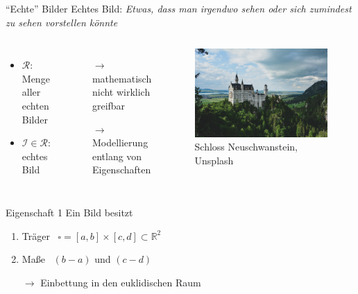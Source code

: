 \documentclass[10pt]{beamer}
\newcommand{\R}{\mathbb{R}}
\begin{document}
\begin{frame}{``Echte'' Bilder}
  \alert{Echtes Bild}: \emph{Etwas, dass man irgendwo sehen oder sich zumindest zu sehen vorstellen könnte}

  \begin{columns}[T,onlytextwidth]
      \begin{itemize}
        \item \( \mathcal{R} \): Menge aller echten Bilder
        \item \( \mathcal{I} \in \mathcal{R} \): echtes Bild
      \end{itemize}

      \begin{itemize}
        \pause{}
        \item[\( \to \)] mathematisch nicht wirklich greifbar \\
        \pause{}
        \item[\( \to \)] Modellierung entlang von Eigenschaften
      \end{itemize}
      \pause{}
      \begin{figure}
        \includegraphics[width=\textwidth]{neuschwanstein}
        \caption*{Schloss Neuschwanstein, Unsplash}
      \end{figure}
  \end{columns}

\end{frame}

\begin{frame}{Eigenschaft 1}
  Ein Bild besitzt
  \begin{enumerate}
    \item \alert{Träger} \  \( \square = [a,b] \times [c,d] \subset \R^2 \)
    \item \alert{Maße} \  \( (b-a) \) und \( ( c-d ) \)
  \end{enumerate}

  \begin{itemize}
    \item[\( \to \)] Einbettung in den euklidischen Raum
  \end{itemize}
\end{frame}
\end{document}
